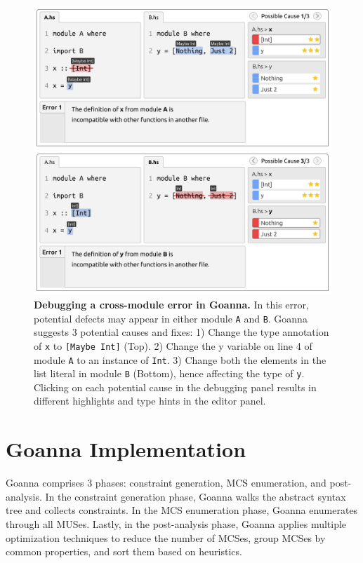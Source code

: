 \documentclass[pdflatex,sn-nature,Numbered]{sn-jnl}%
\begin{document}
    \begin{figure}[ht!]
        \centering
        \includegraphics[width=\linewidth]{images/goanna-cross-module}
        \caption[Debugging a cross-module error in Goanna]{\textbf{Debugging a cross-module error in Goanna.} In this error, potential defects may appear in either module \texttt{A} and \texttt{B}. Goanna suggests 3 potential causes and fixes: 1) Change the type annotation of \texttt{x} to \texttt{[Maybe Int]} (Top). 2) Change the y variable on line 4 of module \texttt{A} to an instance of \texttt{Int}. 3) Change both the elements in the list literal in module \texttt{B} (Bottom), hence affecting the type of \texttt{y}. Clicking on each potential cause in the debugging panel results in different highlights and type hints in the editor panel.}
        \label{fig:goanna-cross-module}
    \end{figure}


    \section{Goanna Implementation} \label{sec:implementation}
    Goanna comprises 3 phases: constraint generation, MCS enumeration, and post-analysis. In the constraint generation phase, Goanna walks the abstract syntax tree and collects constraints. In the MCS enumeration phase, Goanna enumerates through all MUSes. Lastly, in the post-analysis phase, Goanna applies multiple optimization techniques to reduce the number of MCSes, group MCSes by common properties, and sort them based on heuristics.
\end{document}
